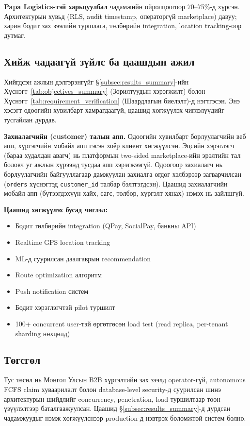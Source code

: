 \textbf{Papa Logistics-тэй харьцуулбал} чадамжийн ойролцоогоор 70--75\%-д хүрсэн. Архитектурын хувьд (RLS, audit timestamp, операторгүй marketplace) давуу; харин бодит зах зээлийн туршлага, төлбөрийн integration, location tracking-оор дутмаг.

\subsection{Хийж чадаагүй зүйлс ба цаашдын ажил}

Хийгдсэн ажлын дэлгэрэнгүйг §\ref{subsec:results_summary}-ийн Хүснэгт~\ref{tab:objectives_summary} (Зорилтуудын хэрэгжилт) болон Хүснэгт~\ref{tab:requirement_verification} (Шаардлагын биелэлт)-д нэгтгэсэн. Энэ хэсэгт одоогийн хувилбарт хамрагдаагүй, цаашид хөгжүүлэх чиглэлүүдийг тусгайлан дурдав.

\textbf{Захиалагчийн (customer) талын апп.} Одоогийн хувилбарт борлуулагчийн веб апп, хүргэгчийн мобайл апп гэсэн хоёр клиент хөгжүүлсэн. Эцсийн хэрэглэгч (бараа худалдан авагч) нь платформын two-sided marketplace-ийн эрэлтийн тал боловч уг ажлын хүрээнд тусдаа апп хэрэгжээгүй. Одоогоор захиалагч нь борлуулагчийн байгууллагаар дамжуулан захиалга өгдөг хэлбэрээр загварчилсан (\texttt{orders} хүснэгтэд \texttt{customer\_id} талбар бэлтгэгдсэн). Цаашид захиалагчийн мобайл апп (бүтээгдэхүүн хайх, сагс, төлбөр, хүргэлт хянах) нэмэх нь зайлшгүй.

\textbf{Цаашид хөгжүүлэх бусад чиглэл:}
\begin{itemize}
    \item Бодит төлбөрийн integration (QPay, SocialPay, банкны API)
    \item Realtime GPS location tracking
    \item ML-д суурилсан даалгаврын recommendation
    \item Route optimization алгоритм
    \item Push notification систем
    \item Бодит хэрэглэгчтэй pilot туршилт
    \item 100+ concurrent user-тэй өргөтгөсөн load test (read replica, per-tenant sharding нөхцөлд)
\end{itemize}

\subsection{Төгсгөл}

Тус төсөл нь Монгол Улсын B2B хүргэлтийн зах зээлд operator-гүй, autonomous FCFS claim хуваарилалт болон database-level security-д суурилсан шинэ архитектурын шийдлийг concurrency, penetration, load туршилтаар тоон үзүүлэлтээр баталгаажуулсан. Цаашид §\ref{subsec:results_summary}-д дурдсан чадамжуудыг нэмж хөгжүүлснээр production-д нэвтрэх боломжтой систем болно.

